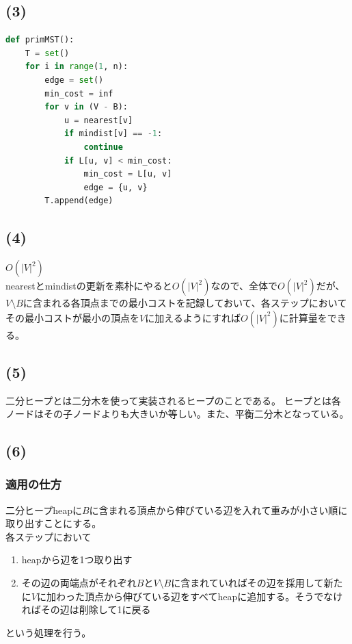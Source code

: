 \documentclass[a4paper,12pt,xelatex,ja=standard]{bxjsarticle}
\begin{document}
\subsection*{(3)}
\begin{lstlisting}[language=Python, caption=プリム法]
def primMST():
    T = set()
    for i in range(1, n):
        edge = set()
        min_cost = inf
        for v in (V - B):
            u = nearest[v]
            if mindist[v] == -1:
                continue
            if L[u, v] < min_cost:
                min_cost = L[u, v]
                edge = {u, v}
        T.append(edge)

\end{lstlisting}

\subsection*{(4)}
$O(|V|^2)$\\
nearestとmindistの更新を素朴にやると$O(|V|^2)$なので、全体で$O(|V|^2)$だが、$V \setminus B$に含まれる各頂点までの最小コストを記録しておいて、各ステップにおいてその最小コストが最小の頂点を$V$に加えるようにすれば$O(|V|^2)$に計算量をできる。

\subsection*{(5)}
二分ヒープとは二分木を使って実装されるヒープのことである。
ヒープとは各ノードはその子ノードよりも大きいか等しい。また、平衡二分木となっている。

\subsection*{(6)}
\subsubsection*{適用の仕方}
二分ヒープheapに$B$に含まれる頂点から伸びている辺を入れて重みが小さい順に取り出すことにする。\\
各ステップにおいて
\begin{enumerate}
  \item heapから辺を1つ取り出す
  \item その辺の両端点がそれぞれ$B$と$V \setminus B$に含まれていればその辺を採用して新たに$V$に加わった頂点から伸びている辺をすべてheapに追加する。そうでなければその辺は削除して1に戻る
\end{enumerate}
という処理を行う。
\end{document}
